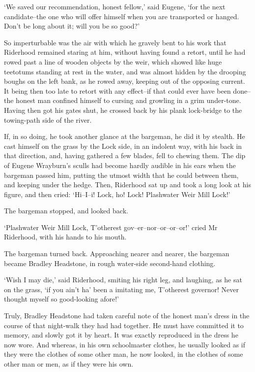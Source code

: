 ‘We saved our recommendation, honest fellow,’ said Eugene, ‘for the next
candidate--the one who will offer himself when you are transported or
hanged. Don’t be long about it; will you be so good?’

So imperturbable was the air with which he gravely bent to his work that
Riderhood remained staring at him, without having found a retort, until
he had rowed past a line of wooden objects by the weir, which showed
like huge teetotums standing at rest in the water, and was almost hidden
by the drooping boughs on the left bank, as he rowed away, keeping
out of the opposing current. It being then too late to retort with
any effect--if that could ever have been done--the honest man confined
himself to cursing and growling in a grim under-tone. Having then
got his gates shut, he crossed back by his plank lock-bridge to the
towing-path side of the river.

If, in so doing, he took another glance at the bargeman, he did it by
stealth. He cast himself on the grass by the Lock side, in an indolent
way, with his back in that direction, and, having gathered a few blades,
fell to chewing them. The dip of Eugene Wrayburn’s sculls had become
hardly audible in his ears when the bargeman passed him, putting the
utmost width that he could between them, and keeping under the hedge.
Then, Riderhood sat up and took a long look at his figure, and then
cried: ‘Hi--I--i! Lock, ho! Lock! Plashwater Weir Mill Lock!’

The bargeman stopped, and looked back.

‘Plashwater Weir Mill Lock, T’otherest gov--er--nor--or--or--or!’ cried
Mr Riderhood, with his hands to his mouth.

The bargeman turned back. Approaching nearer and nearer, the bargeman
became Bradley Headstone, in rough water-side second-hand clothing.

‘Wish I may die,’ said Riderhood, smiting his right leg, and laughing,
as he sat on the grass, ‘if you ain’t ha’ been a imitating me,
T’otherest governor! Never thought myself so good-looking afore!’

Truly, Bradley Headstone had taken careful note of the honest man’s
dress in the course of that night-walk they had had together. He must
have committed it to memory, and slowly got it by heart. It was
exactly reproduced in the dress he now wore. And whereas, in his own
schoolmaster clothes, he usually looked as if they were the clothes of
some other man, he now looked, in the clothes of some other man or men,
as if they were his own.

